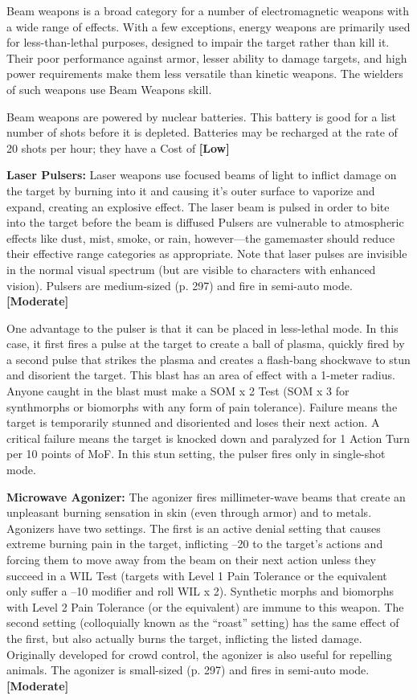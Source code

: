 Beam weapons is a broad category for a number of electromagnetic
weapons with a wide range of effects. With
a few exceptions, energy weapons are primarily used for 
less-than-lethal purposes, designed to impair the target 
rather than kill it. Their poor performance against armor, 
lesser ability to damage targets, and high power requirements
make them less versatile than kinetic weapons.
The wielders of such weapons use Beam Weapons skill.

Beam weapons are powered by nuclear batteries. 
This battery is good for a list number of shots before 
it is depleted. Batteries may be recharged at the rate of 
20 shots per hour; they have a Cost of \textbf{[Low]}

\textbf{Laser Pulsers: }Laser weapons use focused beams of 
light to inflict damage on the target by burning into it 
and causing it's outer surface to vaporize and expand, 
creating an explosive effect. The laser beam is pulsed 
in order to bite into the target before the beam is diffused
Pulsers are vulnerable to atmospheric effects
like dust, mist, smoke, or rain, however—the gamemaster
should reduce their effective range categories
as appropriate. Note that laser pulses are invisible in 
the normal visual spectrum (but are visible to characters
with enhanced vision). Pulsers are medium-sized
(p. 297) and fire in semi-auto mode. \textbf{[Moderate]}

One advantage to the pulser is that it can be placed 
in less-lethal mode. In this case, it first fires a pulse at 
the target to create a ball of plasma, quickly fired by 
a second pulse that strikes the plasma and creates a 
flash-bang shockwave to stun and disorient the target. 
This blast has an area of effect with a 1-meter radius. 
Anyone caught in the blast must make a SOM x 2 
Test (SOM x 3 for synthmorphs or biomorphs with 
any form of pain tolerance). Failure means the target 
is temporarily stunned and disoriented and loses 
their next action. A critical failure means the target 
is knocked down and paralyzed for 1 Action Turn per 
10 points of MoF. In this stun setting, the pulser fires 
only in single-shot mode.

\textbf{Microwave Agonizer: }The agonizer fires millimeter-wave
beams that create an unpleasant burning sensation
in skin (even through armor) and to metals.
Agonizers have two settings. The first is an active 
denial setting that causes extreme burning pain in the 
target, inflicting –20 to the target's actions and forcing
them to move away from the beam on their next
action unless they succeed in a WIL Test (targets with 
Level 1 Pain Tolerance or the equivalent only suffer 
a –10 modifier and roll WIL x 2). Synthetic morphs 
and biomorphs with Level 2 Pain Tolerance (or the 
equivalent) are immune to this weapon. The second 
setting (colloquially known as the ``roast'' setting) has 
the same effect of the first, but also actually burns the 
target, inflicting the listed damage. Originally developed
for crowd control, the agonizer is also useful for
repelling animals. The agonizer is small-sized (p. 297) 
and fires in semi-auto mode. \textbf{[Moderate]}

